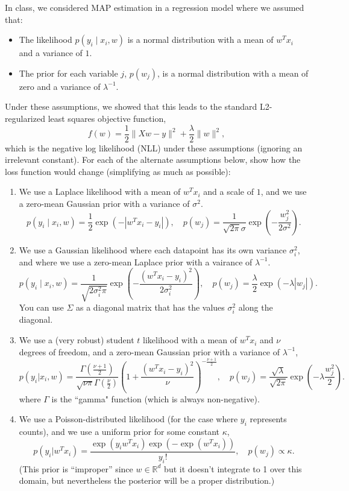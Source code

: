 \documentclass{article}
\def\blu#1{{\color{blu}#1}}
\def\norm#1{\|#1\|}
\def\R{\mathbb{R}}
\def\items#1{\begin{itemize}#1\end{itemize}}
\def\enum#1{\begin{enumerate}#1\end{enumerate}}
\begin{document}
In class, we considered MAP estimation in a regression model where we assumed that:
\items{
\item The likelihood $p(y_i \mid x_i, w)$ is a normal distribution with a mean of $w^Tx_i$ and a variance of $1$.
\item The prior for each variable $j$, $p(w_j)$, is a normal distribution with a mean of zero and a variance of $\lambda^{-1}$.
}
Under these assumptions, we showed that this leads to the standard L2-regularized least squares objective function,
\[
f(w) = \frac{1}{2}\norm{Xw - y}^2 + \frac \lambda 2 \norm{w}^2,
\]
which is the negative log likelihood (NLL) under these assumptions (ignoring an irrelevant constant).
\blu{For each of the alternate assumptions below, show how the loss function would change} (simplifying as much as possible):
\enum{
\item We use a Laplace likelihood with a mean of $w^Tx_i$ and a scale of $1$, and we use a zero-mean Gaussian prior with a variance of $\sigma^2$.
\[
p(y_i \mid x_i, w) = \frac 1 2 \exp(-|w^Tx_i - y_i|), \quad p(w_j) = \frac{1}{\sqrt{2\pi}\sigma}\exp\left(-\frac{w_j^2}{2\sigma^2}\right).
\]
\item We use a Gaussian likelihood where each datapoint has its own variance $\sigma_i^2$, and where we use a zero-mean Laplace prior with a vairance of $\lambda^{-1}$.
\[
p(y_i \mid x_i,w) = \frac{1}{\sqrt{2\sigma_i^2\pi}}\exp\left(-\frac{(w^Tx_i - y_i)^2}{2\sigma_i^2}\right), \quad p(w_j) = \frac{\lambda}{2}\exp(-\lambda|w_j|).
\]
You can use $\Sigma$ as a diagonal matrix that has the values $\sigma_i^2$ along the diagonal.
\item We use a (very robust) student $t$ likelihood with a mean of $w^Tx_i$ and $\nu$ degrees of freedom, and a zero-mean Gaussian prior with a variance of $\lambda^{-1}$,
\[
p(y_i | x_i, w) = \frac{\Gamma\left(\frac{\nu + 1}{2}\right)}{\sqrt{\nu\pi}\Gamma\left(\frac \nu 2\right)}\left(1 + \frac{(w^Tx_i - y_i)^2}{\nu}\right)^{-\frac{\nu+1}{2}}, \quad p(w_j) = \frac{\sqrt{\lambda}}{\sqrt{2\pi}}\exp\left(-\lambda\frac{w_j^2}{2}\right).
\]
where $\Gamma$ is the ``gamma" function (which is always non-negative).
\item We use a Poisson-distributed likelihood (for the case where $y_i$ represents counts), and we use a uniform prior for some constant $\kappa$,
\[
p(y_i | w^Tx_i) = \frac{\exp(y_iw^Tx_i)\exp(-\exp(w^Tx_i))}{y_i!}, \quad p(w_j) \propto \kappa.
\]
(This prior is 	``improper'' since $w\in\R^d$ but it doesn't integrate to 1 over this domain, but nevertheless the posterior will be a proper distribution.)
}
\end{document}
